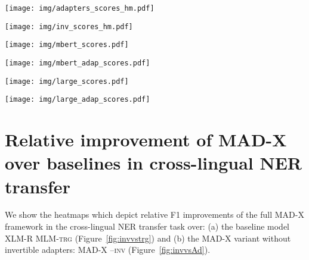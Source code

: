 \documentclass[11pt,a4paper]{article}
\newcommand{\model}[1]{\textsc{MAD-X}}
\newcommand{\mlmtrg}[1]{\textsc{XLM-R MLM-trg}}
\begin{document}
 \begin{figure*} \centering
\texttt{[image: img/adapters\_scores\_hm.pdf]}
\caption{Mean F1 scores of our framework without invertible adapters (\model{} -- \textsc{inv}) for cross-lingual transfer on NER.}
\label{fig:adapters_scores_hm}
\end{figure*}

 \begin{figure*} \centering
\texttt{[image: img/inv\_scores\_hm.pdf]}
\caption{Mean F1 scores of our complete adapter-based framework (\model{}) for cross-lingual transfer on NER.}
\label{fig:inv_scores_hm}
\end{figure*}

 \begin{figure*} \centering
\texttt{[image: img/mbert\_scores.pdf]}
\caption{Mean F1 scores of mBERT for cross-lingual transfer on NER.}
\label{fig:mbert_scores}
\end{figure*}

 \begin{figure*} \centering
\texttt{[image: img/mbert\_adap\_scores.pdf]}
\caption{Mean F1 scores of our complete adapter-based framework (\model{}) for cross-lingual transfer on NER.}
\label{fig:mbert_adap_scores}
\end{figure*}

 \begin{figure*} \centering
\texttt{[image: img/large\_scores.pdf]}
\caption{Mean F1 scores of XLM-R for cross-lingual transfer on NER.}
\label{fig:large_scores}
\end{figure*}

 \begin{figure*} \centering
\texttt{[image: img/large\_adap\_scores.pdf]}
\caption{Mean F1 scores of our complete adapter-based framework (\model{}) for cross-lingual transfer on NER.}
\label{fig:large_adap_scores}
\end{figure*}

\section{Relative improvement of MAD-X over baselines in cross-lingual NER transfer}
\label{s:relative-appendix}
We show the heatmaps which depict relative F1 improvements of the full \model{} framework in the cross-lingual NER transfer task over: (a) the baseline model \mlmtrg{} (Figure~\ref{fig:invvstrg}) and (b) the \model{} variant without invertible adapters: \model{} --\textsc{inv} (Figure~\ref{fig:invvsAd}).
\end{document}
